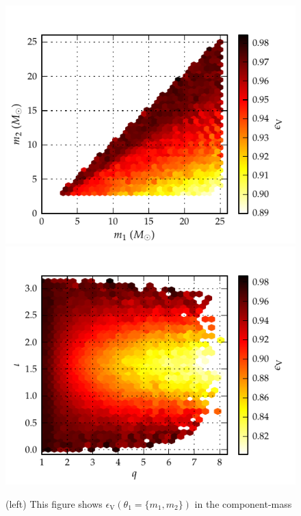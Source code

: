 \begin{figure}
\centering
\includegraphics[scale=0.04, clip=false, totalheight=0.3\textheight, width=\columnwidth]{figures/eobpnmetric/EOBHMvsEOB22VeffLossm1m2-PRD.pdf} %
\includegraphics[scale=0.04, clip=false, totalheight=0.3\textheight, width=\columnwidth]{figures/eobpnmetric/EOBHMvsEOB22VeffLossqinc-PRD.pdf} %
\caption{\label{fig:VeffLoss_eob22eobhm} (left) This figure shows $\epsilon_{\mathrm{V}}\left(\theta_1=\{m_1,m_2\}\right)$ in the component-mass
}
\end{figure}
